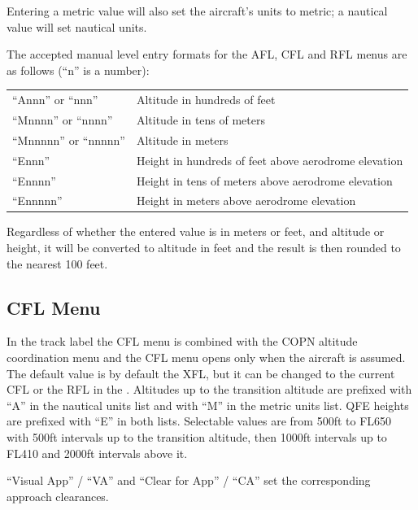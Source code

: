 \documentclass[a4paper,oneside,11pt]{memoir}
\begin{document}
\bigskip

Entering a metric value will also set the aircraft’s units to metric; a nautical value will set nautical units.

\bigskip

The accepted manual level entry formats for the AFL, CFL and RFL menus are as follows (“n” is a number):

\bigskip

\begin{longtable}{p{5cm} p{7.5cm}}
“Annn” or “nnn”         & Altitude in hundreds of feet\\
“Mnnnn” or “nnnn”       & Altitude in tens of meters\\
“Mnnnnn” or “nnnnn”     & Altitude in meters\\
“Ennn”                  & Height in hundreds of feet above aerodrome elevation\\
“Ennnn”                 & Height in tens of meters above aerodrome elevation\\
“Ennnnn”                & Height in meters above aerodrome elevation\\
\end{longtable}    

\bigskip

Regardless of whether the entered value is in meters or feet, and altitude or height, it will be converted to altitude in feet and the result is then rounded to the nearest 100 feet.

\subsection{CFL Menu}
\label{menu:cfl}

In the track label the CFL menu is combined with the COPN altitude coordination menu and the CFL menu opens only when the aircraft is assumed. The default value is by default the XFL, but it can be changed to the current CFL or the RFL in the . Altitudes up to the transition altitude are prefixed with “A” in the nautical units list and with “M” in the metric units list. QFE heights are prefixed with “E” in both lists. Selectable values are from 500ft to FL650 with 500ft intervals up to the transition altitude, then 1000ft intervals up to FL410 and 2000ft intervals above it. 

\bigskip

“Visual App” / “VA” and “Clear for App” / “CA” set the corresponding approach clearances.
\end{document}
